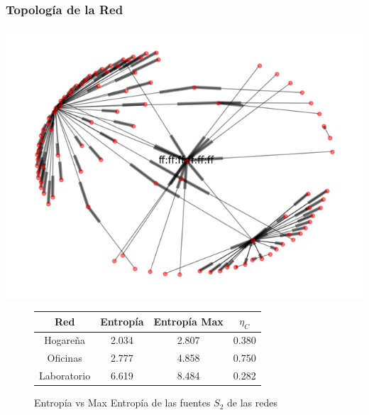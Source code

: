 \subsubsection{Topolog\'ia de la Red}
\begin{center}
 \includegraphics[scale=0.6]{../plots/labos_s2_topologia.png}
\end{center}

\begin{figure}
	\centering
	\begin{tabular}{|c|c|c|c|}
		\hline
		Red & Entropía & Entropía Max & $\eta_{C}$ \\
		\hline
		Hogareña & 2.034 & 2.807 & 0.380 \\
		\hline
		Oficinas & 2.777 & 4.858 & 0.750 \\
		\hline
		Laboratorio & 6.619 & 8.484 & 0.282 \\
		\hline
	\end{tabular}
	\caption{Entropía vs Max Entropía de las fuentes $S_2$ de las redes}
\end{figure}
